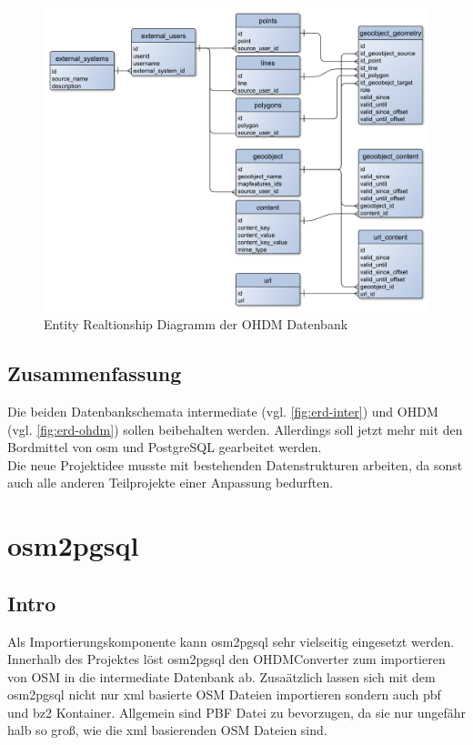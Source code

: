 \begin{figure}[h]
	\caption{Entity Realtionship Diagramm der \ac{OHDM} Datenbank}
	\label{fig:erd-ohdm}
	\includegraphics[width=\linewidth]{img/ohdm-db-erd.pdf}
\end{figure}

\section{Zusammenfassung}
Die beiden Datenbankschemata intermediate (vgl. \autoref{fig:erd-inter}) und \ac{OHDM} (vgl. \autoref{fig:erd-ohdm}) sollen beibehalten werden. Allerdings soll jetzt mehr mit den Bordmittel von osm und PostgreSQL gearbeitet werden.\\

Die neue Projektidee musste mit bestehenden Datenstrukturen arbeiten, da sonst auch alle anderen Teilprojekte einer Anpassung bedurften.

\chapter{osm2pgsql}
\section{Intro}
Als Importierungskomponente kann osm2pgsql\cite{osm2pgsql-manual} sehr vielseitig eingesetzt werden. Innerhalb des Projektes löst osm2pgsql den OHDMConverter zum importieren von \ac{OSM} in die intermediate Datenbank ab. Zusaätzlich lassen sich mit dem osm2pgsql nicht nur xml basierte \ac{OSM} Dateien importieren sondern auch pbf und bz2 Kontainer. Allgemein sind \ac{PBF} Datei zu bevorzugen, da sie nur ungefähr halb so groß, wie die xml basierenden \ac{OSM} Dateien sind.\cite{osm:pbf}\\

